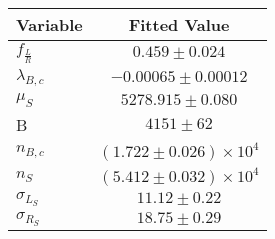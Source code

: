 \begin{tabular}[t]{lc}
\hline
Variable &Fitted Value\\
\hline\hline
$f_{\frac{L}{R}}$&$0.459\pm0.024$\\
\hline
$\lambda_{B,c}$&$-0.00065\pm0.00012$\\
\hline
$\mu_S$&$5278.915\pm0.080$\\
\hline
B&$4151\pm62$\\
\hline
$n_{B,c}$&$(1.722\pm0.026)\times 10^4$\\
\hline
$n_S$&$(5.412\pm0.032)\times 10^4$\\
\hline
$\sigma_{L_S}$&$11.12\pm0.22$\\
\hline
$\sigma_{R_S}$&$18.75\pm0.29$\\
\hline
\end{tabular}